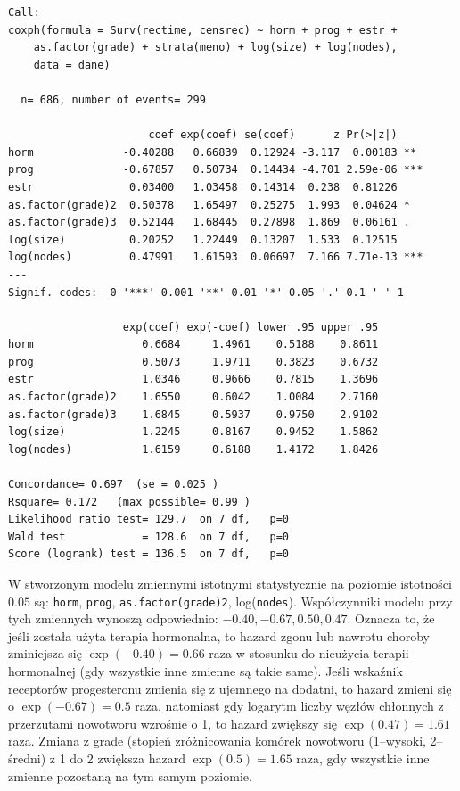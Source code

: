 \documentclass[]{article}
\begin{document}
\begin{verbatim}
Call:
coxph(formula = Surv(rectime, censrec) ~ horm + prog + estr + 
    as.factor(grade) + strata(meno) + log(size) + log(nodes), 
    data = dane)

  n= 686, number of events= 299 

                      coef exp(coef) se(coef)      z Pr(>|z|)    
horm              -0.40288   0.66839  0.12924 -3.117  0.00183 ** 
prog              -0.67857   0.50734  0.14434 -4.701 2.59e-06 ***
estr               0.03400   1.03458  0.14314  0.238  0.81226    
as.factor(grade)2  0.50378   1.65497  0.25275  1.993  0.04624 *  
as.factor(grade)3  0.52144   1.68445  0.27898  1.869  0.06161 .  
log(size)          0.20252   1.22449  0.13207  1.533  0.12515    
log(nodes)         0.47991   1.61593  0.06697  7.166 7.71e-13 ***
---
Signif. codes:  0 '***' 0.001 '**' 0.01 '*' 0.05 '.' 0.1 ' ' 1

                  exp(coef) exp(-coef) lower .95 upper .95
horm                 0.6684     1.4961    0.5188    0.8611
prog                 0.5073     1.9711    0.3823    0.6732
estr                 1.0346     0.9666    0.7815    1.3696
as.factor(grade)2    1.6550     0.6042    1.0084    2.7160
as.factor(grade)3    1.6845     0.5937    0.9750    2.9102
log(size)            1.2245     0.8167    0.9452    1.5862
log(nodes)           1.6159     0.6188    1.4172    1.8426

Concordance= 0.697  (se = 0.025 )
Rsquare= 0.172   (max possible= 0.99 )
Likelihood ratio test= 129.7  on 7 df,   p=0
Wald test            = 128.6  on 7 df,   p=0
Score (logrank) test = 136.5  on 7 df,   p=0
\end{verbatim}

W stworzonym modelu zmiennymi istotnymi statystycznie na poziomie
istotności $0.05$ są: \texttt{horm}, \texttt{prog},
\texttt{as.factor(grade)2}, log(\texttt{nodes}). Współczynniki modelu
przy tych zmiennych wynoszą odpowiednio: $-0.40, -0.67, 0.50, 0.47$.
Oznacza to, że jeśli została użyta terapia hormonalna, to hazard zgonu
lub nawrotu choroby zminiejsza się $\exp(-0.40)=0.66$ raza w stosunku do
nieużycia terapii hormonalnej (gdy wszystkie inne zmienne są takie
same). Jeśli wskaźnik receptorów progesteronu zmienia się z ujemnego na
dodatni, to hazard zmieni się o $\exp(-0.67)=0.5$ raza, natomiast gdy
logarytm liczby węzłów chłonnych z przerzutami nowotworu wzrośnie o 1,
to hazard zwiększy się $\exp(0.47)=1.61$ raza. Zmiana z grade (stopień
zróżnicowania komórek nowotworu (1--wysoki, 2--średni) z 1 do 2 zwiększa
hazard $\exp(0.5)=1.65$ raza, gdy wszystkie inne zmienne pozostaną na
tym samym poziomie.
\end{document}
